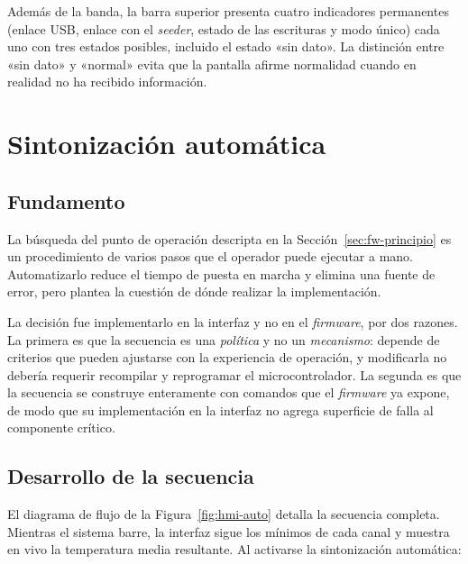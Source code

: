 Además de la banda, la barra superior presenta cuatro indicadores permanentes (enlace USB, enlace con el \emph{seeder}, estado de las escrituras y modo único) cada uno con tres estados posibles, incluido el estado «sin dato». La distinción entre «sin dato» y «normal» evita que la pantalla afirme normalidad cuando en realidad no ha recibido información.

\section{Sintonización automática}
\label{sec:hmi-auto}

\subsection{Fundamento}

La búsqueda del punto de operación descripta en la Sección~\ref{sec:fw-principio} es un procedimiento de varios pasos que el operador puede ejecutar a mano. Automatizarlo reduce el tiempo de puesta en marcha y elimina una fuente de error, pero plantea la cuestión de dónde realizar la implementación.

La decisión fue implementarlo en la interfaz y no en el \emph{firmware}, por dos razones. La primera es que la secuencia es una \emph{política} y no un \emph{mecanismo}: depende de criterios que pueden ajustarse con la experiencia de operación, y modificarla no debería requerir recompilar y reprogramar el microcontrolador. La segunda es que la secuencia se construye enteramente con comandos que el \emph{firmware} ya expone, de modo que su implementación en la interfaz no agrega superficie de falla al componente crítico.

\subsection{Desarrollo de la secuencia}

El diagrama de flujo de la Figura~\ref{fig:hmi-auto} detalla la secuencia completa. Mientras el sistema barre, la interfaz sigue los mínimos de cada canal y muestra en vivo la temperatura media resultante. Al activarse la sintonización automática:

